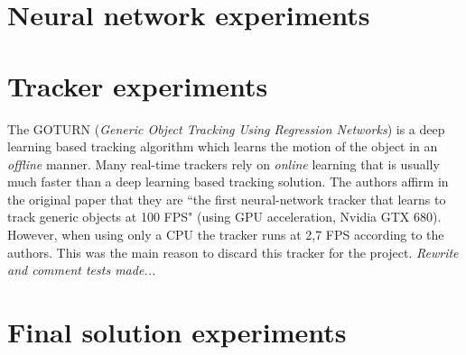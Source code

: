\section{Neural network experiments}

\section{Tracker experiments}
The GOTURN (\textit{Generic Object Tracking Using Regression Networks}) is a deep learning based tracking algorithm which learns the motion of the object in an \textit{offline} manner. Many real-time trackers rely on \textit{online} learning that is usually much faster than a deep learning based tracking solution. The authors affirm in the original paper \cite{held2016learning} that they are ``the first neural-network tracker that learns to track generic objects at 100 FPS" (using GPU acceleration, Nvidia GTX 680). However, when using only a CPU the tracker runs at 2,7 FPS according to the authors. This was the main reason to discard this tracker for the project. \textit{Rewrite and comment tests made...}%
\section{Final solution experiments}
